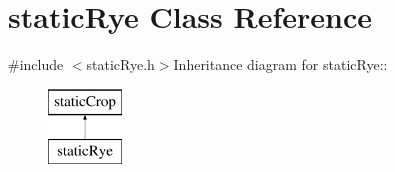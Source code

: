 \hypertarget{classstatic_rye}{
\section{staticRye Class Reference}
\label{classstatic_rye}
}


{\ttfamily \#include $<$staticRye.h$>$}Inheritance diagram for staticRye::\begin{figure}[H]
\begin{center}
\leavevmode
\includegraphics[height=2cm]{classstatic_rye}
\end{center}
\end{figure}

